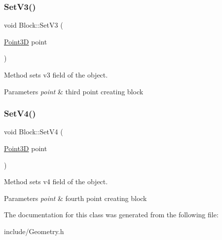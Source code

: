 \subsubsection{\texorpdfstring{Set\+V3()}{SetV3()}}
{\footnotesize\ttfamily void Block\+::\+Set\+V3 (\begin{DoxyParamCaption}\item[{\hyperlink{class_point3_d}{Point3D}}]{point }\end{DoxyParamCaption})}

Method sets v3 field of the object. 
\begin{DoxyParams}{Parameters}
{\em point} & third point creating block \\
\hline
\end{DoxyParams}
\hypertarget{class_block_aba65bfccbd291227fda20d10d49ae345}{}\label{class_block_aba65bfccbd291227fda20d10d49ae345} 
\subsubsection{\texorpdfstring{Set\+V4()}{SetV4()}}
{\footnotesize\ttfamily void Block\+::\+Set\+V4 (\begin{DoxyParamCaption}\item[{\hyperlink{class_point3_d}{Point3D}}]{point }\end{DoxyParamCaption})}

Method sets v4 field of the object. 
\begin{DoxyParams}{Parameters}
{\em point} & fourth point creating block \\
\hline
\end{DoxyParams}


The documentation for this class was generated from the following file\+:\begin{DoxyCompactItemize}
\item 
include/Geometry.\+h\end{DoxyCompactItemize}
